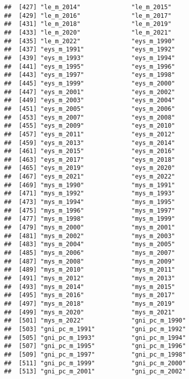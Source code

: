 \documentclass[
]{article}
\begin{document}
\begin{verbatim}
##  [427] "le_m_2014"              "le_m_2015"             
##  [429] "le_m_2016"              "le_m_2017"             
##  [431] "le_m_2018"              "le_m_2019"             
##  [433] "le_m_2020"              "le_m_2021"             
##  [435] "le_m_2022"              "eys_m_1990"            
##  [437] "eys_m_1991"             "eys_m_1992"            
##  [439] "eys_m_1993"             "eys_m_1994"            
##  [441] "eys_m_1995"             "eys_m_1996"            
##  [443] "eys_m_1997"             "eys_m_1998"            
##  [445] "eys_m_1999"             "eys_m_2000"            
##  [447] "eys_m_2001"             "eys_m_2002"            
##  [449] "eys_m_2003"             "eys_m_2004"            
##  [451] "eys_m_2005"             "eys_m_2006"            
##  [453] "eys_m_2007"             "eys_m_2008"            
##  [455] "eys_m_2009"             "eys_m_2010"            
##  [457] "eys_m_2011"             "eys_m_2012"            
##  [459] "eys_m_2013"             "eys_m_2014"            
##  [461] "eys_m_2015"             "eys_m_2016"            
##  [463] "eys_m_2017"             "eys_m_2018"            
##  [465] "eys_m_2019"             "eys_m_2020"            
##  [467] "eys_m_2021"             "eys_m_2022"            
##  [469] "mys_m_1990"             "mys_m_1991"            
##  [471] "mys_m_1992"             "mys_m_1993"            
##  [473] "mys_m_1994"             "mys_m_1995"            
##  [475] "mys_m_1996"             "mys_m_1997"            
##  [477] "mys_m_1998"             "mys_m_1999"            
##  [479] "mys_m_2000"             "mys_m_2001"            
##  [481] "mys_m_2002"             "mys_m_2003"            
##  [483] "mys_m_2004"             "mys_m_2005"            
##  [485] "mys_m_2006"             "mys_m_2007"            
##  [487] "mys_m_2008"             "mys_m_2009"            
##  [489] "mys_m_2010"             "mys_m_2011"            
##  [491] "mys_m_2012"             "mys_m_2013"            
##  [493] "mys_m_2014"             "mys_m_2015"            
##  [495] "mys_m_2016"             "mys_m_2017"            
##  [497] "mys_m_2018"             "mys_m_2019"            
##  [499] "mys_m_2020"             "mys_m_2021"            
##  [501] "mys_m_2022"             "gni_pc_m_1990"         
##  [503] "gni_pc_m_1991"          "gni_pc_m_1992"         
##  [505] "gni_pc_m_1993"          "gni_pc_m_1994"         
##  [507] "gni_pc_m_1995"          "gni_pc_m_1996"         
##  [509] "gni_pc_m_1997"          "gni_pc_m_1998"         
##  [511] "gni_pc_m_1999"          "gni_pc_m_2000"         
##  [513] "gni_pc_m_2001"          "gni_pc_m_2002"         

\end{verbatim}
\end{document}
